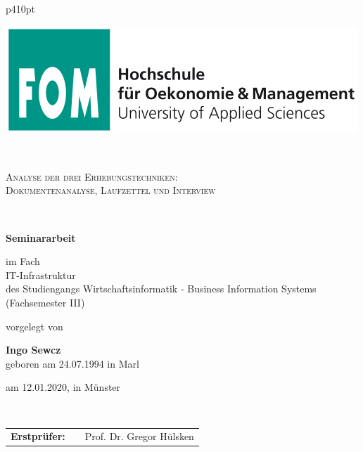\begin{center}
\begin{tabular}{p{410pt}}%


\begin{center}
\includegraphics[scale=0.4]{img/fomlogo.png}
\end{center}


\\

\begin{center}
\LARGE{\textsc{
Analyse der drei Erhebungstechniken:\\Dokumentenanalyse, Laufzettel und Interview\\
}}
\end{center}

\\

\begin{center}
\textbf{\Large{Seminararbeit}}
\end{center}


\begin{center}
im Fach\\
IT-Infrastruktur \\
des Studiengangs Wirtschaftsinformatik - Business Information Systems \\
(Fachsemester III)
\end{center}


\begin{center}
vorgelegt von
\end{center}

\begin{center}
\large{\textbf{Ingo Sewcz}} \\
\small{geboren am 24.07.1994 in Marl}
\end{center}

\begin{center}
\large{am 12.01.2020, in Münster}
\end{center}

\\

\begin{center}
\begin{tabular}{lll}
\textbf{Erstprüfer:} & & Prof. Dr. Gregor Hülsken\\
\end{tabular}
\end{center}

\end{tabular}
\end{center}
